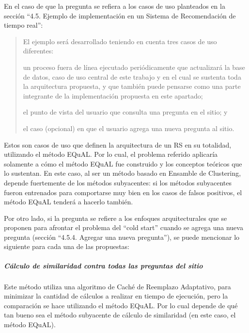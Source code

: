 En el caso de que la pregunta se refiera a los casos de uso planteados en la sección ``4.5. Ejemplo de implementación en un Sistema de Recomendación de tiempo real'':

\begin{quotation}
	El ejemplo será desarrollado teniendo en cuenta tres casos de uso diferentes: \begin{enumerate*} [label=(\roman*)] \item un proceso fuera de línea ejecutado periódicamente que actualizará la base de datos, caso de uso central de este trabajo y en el cual se sustenta toda la arquitectura propuesta, y que también puede pensarse como una parte integrante de la implementación propuesta en este apartado; \item el punto de vista del usuario que consulta una pregunta en el sitio; y \item el caso (opcional) en que el usuario agrega una nueva pregunta al sitio.\end{enumerate*}
\end{quotation}

Estos son casos de uso que definen la arquitectura de un RS en su totalidad, utilizando el método EQuAL. Por lo cual, el problema referido aplicaría solamente a cómo el método EQuAL fue construido y los conceptos teóricos que lo sustentan. En este caso, al ser un método basado en Ensamble de Clustering, depende fuertemente de los métodos subyacentes: si los métodos subyacentes fueron entrenados para comportarse muy bien en los casos de falsos positivos, el método EQuAL tenderá a hacerlo también.

\bigskip

Por otro lado, si la pregunta se refiere a los enfoques arquitecturales que se proponen para afrontar el problema del ``cold start'' cuando se agrega una nueva pregunta (sección ``4.5.4. Agregar una nueva pregunta''), se puede mencionar lo siguiente para cada una de las propuestas:

\subparagraph{Cálculo de similaridad contra todas las preguntas del sitio}
Este método utiliza una algoritmo de Caché de Reemplazo Adaptativo, para minimizar la cantidad de cálculos a realizar en tiempo de ejecución, pero la comparación se hace utilizando el método EQuAL. Por lo cual depende de qué tan bueno sea el método subyacente de cálculo de similaridad (en este caso, el método EQuAL).

